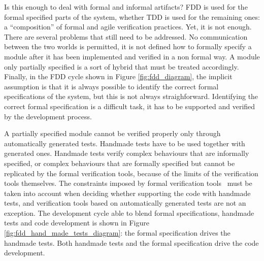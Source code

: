 \documentclass{article}
\begin{document}
Is this enough to deal with formal and informal artifacts?
FDD is used for the formal specified parts of the system, whether TDD is used for the remaining ones: a ``composition'' of formal and agile verification practices.
Yet, it is not enough.
There are several problems that still need to be addressed.
No communication between the two worlds is permitted, it is not defined how to formally specify a module after it has been implemented and verified in a non formal way.
A module only partially specified is a sort of hybrid that must be treated accordingly.
Finally, in the FDD cycle shown in Figure \ref{fig:fdd_diagram}, the implicit assumption is that it is always possible to identify the correct formal specifications of the system, but this is not always straighforward.
Identifying the correct formal specification is a difficult task, it has to be supported and verified by the development process.

A partially specified module cannot be verified properly only through automatically generated tests.
Handmade tests have to be used together with generated ones.
Handmade tests verify complex behaviours that are informally specified, or complex behaviours that are formally specified but cannot be replicated by the formal verification tools, because of the limits of the verification tools themselves. 
The constraints imposed by formal verification tools~\cite{Glass2002} must be taken into account when deciding whether supporting the code with handmade tests, and verification tools based on automatically generated tests are not an exception.
The development cycle able to blend formal specifications, handmade tests and code development is shown in Figure \ref{fig:fdd_hand_made_tests_diagram}: the formal specification drives the handmade tests. 
Both handmade tests and the formal specification drive the code development.
\end{document}
